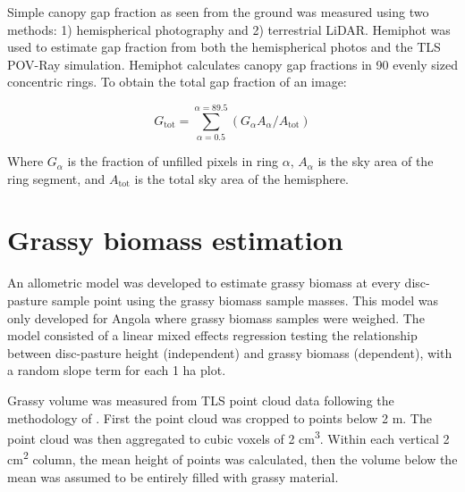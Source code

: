\documentclass[11pt,a4paper]{article}
\begin{document}
Simple canopy gap fraction as seen from the ground was measured using two methods: 1) hemispherical photography and 2) terrestrial LiDAR. Hemiphot \citep{} was used to estimate gap fraction from both the hemispherical photos and the TLS POV-Ray simulation. Hemiphot calculates canopy gap fractions in 90 evenly sized concentric rings. To obtain the total gap fraction of an image:

\begin{equation}
	G_{\text{tot}} = \sum_{\alpha{} = 0.5}^{\alpha{} = 89.5}(G_{\alpha{}} A_{\alpha{}} / A_{\text{tot}})
\end{equation}

Where $G_{\alpha{}}$ is the fraction of unfilled pixels in ring $\alpha{}$, $A_{\alpha{}}$ is the sky area of the ring segment, and $A_{\text{tot}}$ is the total sky area of the hemisphere.

\section{Grassy biomass estimation}

An allometric model was developed to estimate grassy biomass at every disc-pasture sample point using the grassy biomass sample masses. This model was only developed for Angola where grassy biomass samples were weighed. The model consisted of a linear mixed effects regression testing the relationship between disc-pasture height (independent) and grassy biomass (dependent), with a random slope term for each 1 ha plot. 

Grassy volume was measured from TLS point cloud data following the methodology of \citet{}. First the point cloud was cropped to points below 2 m. The point cloud was then aggregated to cubic voxels of 2 cm\textsuperscript{3}. Within each vertical 2 cm\textsuperscript{2} column, the mean height of points was calculated, then the volume below the mean was assumed to be entirely filled with grassy material.
\end{document}
